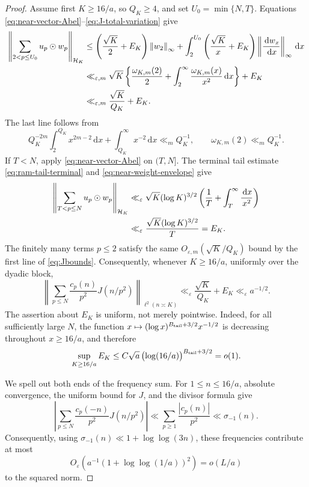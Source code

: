 \documentclass[11pt]{article}
\numberwithin{equation}{section}
\theoremstyle{definition}
\newcommand{\1}{\mathbf 1}
\newcommand{\dd}{\,\mathrm d}
\newcommand{\norm}[1]{\left\lVert#1\right\rVert}
\begin{document}
\begin{proof}
Assume first \(K\ge16/a\), so \(Q_K\ge4\), and set
\(U_0=\min\{N,T\}\).  Equations
\eqref{eq:near-vector-Abel}--\eqref{eq:J-total-variation} give
\begin{align}
 \left\|\sum_{2<p\le U_0}u_p\odot w_p\right\|_{\mathcal H_K}
 &\le
 \left(\frac{\sqrt K}{2}+E_K\right)\norm{w_2}_\infty
 +\int_2^{U_0}
 \left(\frac{\sqrt K}{x}+E_K\right)
 \norm{\frac{\dd w_x}{\dd x}}_\infty\dd x \notag\\
 &\ll_{\varepsilon,m}
 \sqrt K\left\{
 \frac{\omega_{K,m}(2)}2+
 \int_2^\infty\frac{\omega_{K,m}(x)}{x^2}\dd x
 \right\}+E_K \notag\\
 &\ll_{\varepsilon,m}\frac{\sqrt K}{Q_K}+E_K.
 \label{eq:near-Abel-low}
\end{align}
The last line follows from
\[
 Q_K^{-2m}\int_2^{Q_K}x^{2m-2}\dd x
 +\int_{Q_K}^\infty x^{-2}\dd x\ll_m Q_K^{-1},
\qquad
\omega_{K,m}(2)\ll_m Q_K^{-1}.
\]
If \(T<N\), apply \eqref{eq:near-vector-Abel} on \((T,N]\).
The terminal tail estimate \eqref{eq:ram-tail-terminal} and
\eqref{eq:near-weight-envelope} give
\begin{align}
 \left\|\sum_{T<p\le N}u_p\odot w_p\right\|_{\mathcal H_K}
 &\ll_\varepsilon
 \sqrt K(\log K)^{3/2}
 \left(\frac1T+\int_T^\infty\frac{\dd x}{x^2}\right)\notag\\
 &\ll_\varepsilon
 \frac{\sqrt K(\log K)^{3/2}}T=E_K.
 \label{eq:near-Abel-terminal}
\end{align}
The finitely many terms \(p\le2\) satisfy the same
\(O_{\varepsilon,m}(\sqrt K/Q_K)\) bound by the first line of
\eqref{eq:Jbounds}.
Consequently, whenever \(K\ge16/a\), uniformly over the dyadic block,
\begin{equation}\label{eq:near-constant-block}
 \left\|
 \sum_{p\le N}\frac{c_p(n)}{p^2}J(n/p^2)
 \right\|_{\ell^2(n\asymp K)}
 \ll_\varepsilon \frac{\sqrt K}{Q_K}+E_K
 \ll_\varepsilon a^{-1/2}.
\end{equation}
The assertion about \(E_K\) is uniform, not merely pointwise.  Indeed,
for all sufficiently large \(N\), the function
\(x\mapsto(\log x)^{B_{\rm tail}+3/2}x^{-1/2}\) is decreasing throughout
\(x\ge16/a\), and therefore
\begin{equation}\label{eq:near-E-uniform}
 \sup_{K\ge16/a}E_K
 \le C\sqrt a\,\bigl(\log(16/a)\bigr)^{B_{\rm tail}+3/2}=o(1).
\end{equation}

We spell out both ends of the frequency sum.  For
\(1\le n\le16/a\), absolute convergence, the uniform bound for \(J\),
and the divisor formula give
\begin{equation}\label{eq:near-initial-pointwise}
 \left|\sum_{p\le N}\frac{c_p(-n)}{p^2}J(n/p^2)\right|
 \ll\sum_{p\ge1}\frac{|c_p(n)|}{p^2}
 \ll\sigma_{-1}(n).
\end{equation}
Consequently, using
\(\sigma_{-1}(n)\ll1+\log\log(3n)\), these frequencies contribute at
most
\begin{equation}\label{eq:near-initial-sum}
 O_\varepsilon\left(
 a^{-1}(1+\log\log(1/a))^2\right)=o(L/a)
\end{equation}
to the squared norm.


\end{proof}
\end{document}
